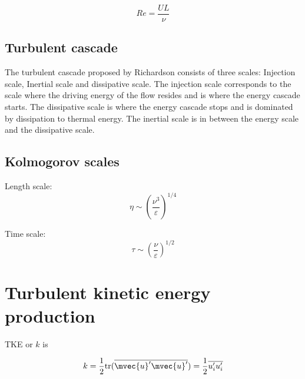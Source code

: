\begin{equation}
Re = \frac{U L}{\nu}
\end{equation}

\subsection*{Turbulent cascade}
The turbulent cascade proposed by Richardson consists of three scales: Injection scale, Inertial scale and dissipative scale. The injection scale corresponds to the scale where the driving energy of the flow resides and is where the energy cascade starts. The dissipative scale is where the energy cascade stops and is dominated by dissipation to thermal energy. The inertial scale is in between the energy scale and the dissipative scale.

\subsection*{Kolmogorov scales}

Length scale:
\begin{equation}
\eta \sim \left(\frac{\nu^3}{\varepsilon}\right)^{1/4}
\end{equation}

Time scale:
\begin{equation}
\tau \sim \left(\frac{\nu}{\varepsilon}\right)^{1/2}
\end{equation}


\section*{Turbulent kinetic energy production}

TKE or $k$ is 

\begin{equation}
k = \frac{1}{2} \mathrm{tr}(\overline{\mvec{u}'\mvec{u}'}) = \frac{1}{2} \overline{u_i' u_i'}
\end{equation}

